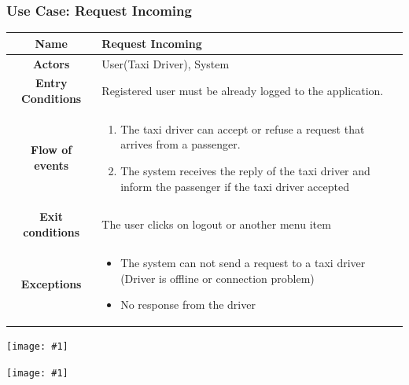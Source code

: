 \documentclass[11pt, a4paper,titlepage]{article}
\newcommand{\image}[1]{
	\begin{center}
		\noindent \texttt{[image: \#1]}
	\end{center}
	}
\begin{document}
\subsubsection{Use Case: Request Incoming}
		\begin{tabularx}{\textwidth}{| c | X |}
			\hline
			\textbf{Name} & 
			Request Incoming
			\\
			\hline
			\textbf{Actors} & 
			User(Taxi Driver), System
			\\
			\hline
			\textbf{Entry Conditions} &
			Registered user must be already logged to the application. 
			\\
			\hline
			\textbf{Flow of events} & 
			\begin{enumerate}
				\item The taxi driver can accept or refuse a request that arrives from a passenger. 
				\item The system receives the reply of the taxi driver and inform the passenger if the taxi driver accepted
				
			\end{enumerate}						
			\\
			\hline
			\textbf{Exit conditions} & 
			The user clicks on logout or another menu item
			\\
			\hline
			\textbf{Exceptions} & 
			\begin{itemize}
				\item The system can not send a request to a taxi driver (Driver is offline or connection problem)
				\item No response from the driver				
			\end{itemize} 
			\\
			\hline		
		\end{tabularx}
		\image{usecase_request_incoming.png}
		\image{diagram_sequence_request_incoming.png}
		\newpage
\end{document}
